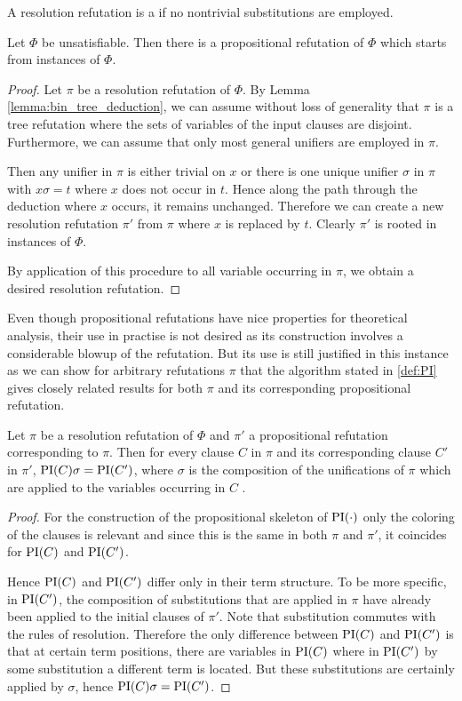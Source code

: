 \begin{defi}
	A resolution refutation is a  if no nontrivial substitutions are employed.
\end{defi}

\begin{lemma}
	Let $\Phi$ be unsatisfiable.
	Then there is a propositional refutation of $\Phi$ which starts from instances of $\Phi$.
\end{lemma}
\begin{proof}
	Let $\pi$ be a resolution refutation of $\Phi$.
	By Lemma \ref{lemma:bin_tree_deduction}, we can assume without loss of generality that $\pi$ is a tree refutation where the sets of variables of the input clauses are disjoint.
	Furthermore, we can assume that only most general unifiers are employed in $\pi$.

	Then any unifier in $\pi$ is either trivial on $x$ or there is one unique unifier $\sigma$ in $\pi$ with $x\sigma = t$ where $x$ does not occur in $t$.
	Hence along the path through the deduction where $x$ occurs, it remains unchanged.
	Therefore we can create a new resolution refutation $\pi'$ from $\pi$ where $x$ is replaced by $t$.
	Clearly $\pi'$ is rooted in instances of $\Phi$.

	By application of this procedure to all variable occurring in $\pi$, we obtain a desired resolution refutation.
\end{proof}

Even though propositional refutations have nice properties for theoretical analysis, their use in practise is not desired as its construction involves a considerable blowup of the refutation. 
But its use is still justified in this instance as we can show for arbitrary refutations $\pi$
that the algorithm stated in \ref{def:PI} gives closely related results for both $\pi$ and its corresponding propositional refutation.

\begin{lemma}
	Let $\pi$ be a resolution refutation of $\Phi$ and $\pi'$ a propositional refutation corresponding to $\pi$.
	Then for every clause $C$ in $\pi$ and its corresponding clause $C'$ in $\pi'$, $\operatorname{PI}(C)\sigma = \operatorname{PI}(C')$, where $\sigma$ is the composition of the unifications of $\pi$ which are applied to the variables occurring in $C$ .
\end{lemma}
\begin{proof}
	For the construction of the propositional skeleton of $\operatorname{PI}(\cdot)$ only the coloring of the clauses is relevant and since this is the same in both $\pi$ and $\pi'$, it coincides for $\operatorname{PI}(C)$ and $\operatorname{PI}(C')$.

	Hence $\operatorname{PI}(C)$ and $\operatorname{PI}(C')$ differ only in their term structure. 
	To be more specific, in $\operatorname{PI}(C')$, the composition of substitutions that are applied in $\pi$ have already been applied to the initial clauses of $\pi'$. 
	Note that substitution commutes with the rules of resolution.
	Therefore the only difference between $\operatorname{PI}(C)$ and $\operatorname{PI}(C')$ is that at certain term positions, there are variables in $\operatorname{PI}(C)$ where in $\operatorname{PI}(C')$ by some substitution a different term is located. 
	But these substitutions are certainly applied by $\sigma$, hence $\operatorname{PI}(C)\sigma = \operatorname{PI}(C')$.
\end{proof}

